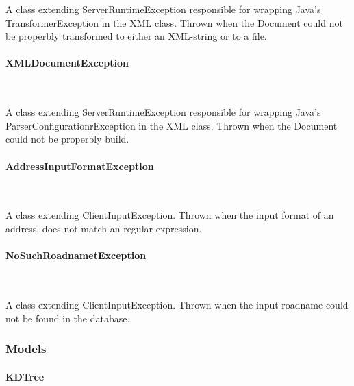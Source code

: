 \documentclass[a4paper,10pt,titlepage]{article}
\begin{document}
A class extending ServerRuntimeException responsible for wrapping Java's TransformerException in the XML class. Thrown when the Document could not be properbly transformed to either an XML-string or to a file.

				\paragraph{XMLDocumentException}\mbox{}\

A class extending ServerRuntimeException responsible for wrapping Java's ParserConfigurationrException in the XML class. Thrown when the Document could not be properbly build.
				
				\paragraph{AddressInputFormatException}\mbox{}\

A class extending ClientInputException. Thrown when the input format of an address, does not match an regular expression.

				\paragraph{NoSuchRoadnametException}\mbox{}\

A class extending ClientInputException. Thrown when the input roadname could not be found in the database.
				
			\subsubsection{Models}
			
				\paragraph{KDTree}\mbox{}\
				
\end{document}
